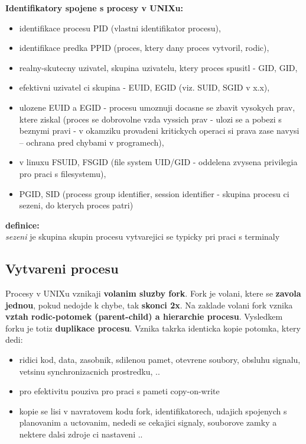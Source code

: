 \documentclass[a4paper, 11pt]{article}
\begin{document}
\textbf{Identifikatory spojene s procesy v UNIXu:}
\begin{itemize}
    \item identifikace procesu PID (vlastni identifikator procesu),
    \item identifikace predka PPID (proces, ktery dany proces vytvoril, rodic),
    \item realny-skutecny uzivatel, skupina uzivatelu, ktery proces spusitl - GID, GID,
    \item efektivni uzivatel ci skupina - EUID, EGID (viz. SUID, SGID v x.x),
    \item ulozene EUID a EGID - procesu umoznuji docasne se zbavit vysokych prav, ktere ziskal (proces se dobrovolne vzda vyssich prav - ulozi se a pobezi s beznymi pravi - v okamziku provadeni kritickych operaci si prava zase navysi -- ochrana pred chybami v programech),
    \item v linuxu FSUID, FSGID (file system UID/GID - oddelena zvysena privilegia pro praci s filesystemu),
    \item PGID, SID (process group identifier, session identifier - skupina procesu ci sezeni, do kterych proces patri) \\
\end{itemize}

\textbf{definice:} \\[0.5em]
\textit{sezeni} je skupina skupin procesu vytvarejici se typicky pri praci s terminaly \\

\subsection{Vytvareni procesu}
Procesy v UNIXu vznikaji \textbf{volanim sluzby fork}. Fork je volani, ktere se \textbf{zavola jednou}, pokud nedojde k chybe, tak \textbf{skonci 2x}. Na zaklade volani fork vznika \textbf{vztah rodic-potomek (parent-child) a hierarchie procesu}. Vysledkem forku je totiz \textbf{duplikace procesu}. Vznika takrka identicka kopie potomka, ktery dedi:
\begin{itemize}
    \item ridici kod, data, zasobnik, sdilenou pamet, otevrene soubory, obsluhu signalu, vetsinu synchronizacnich prostredku, ..
    \item pro efektivitu pouziva pro praci s pameti copy-on-write
    \item kopie se lisi v navratovem kodu fork, identifikatorech, udajich spojenych s planovanim a uctovanim, nededi se cekajici signaly, souborove zamky a nektere dalsi zdroje ci nastaveni .. \\
\end{itemize}
\end{document}
